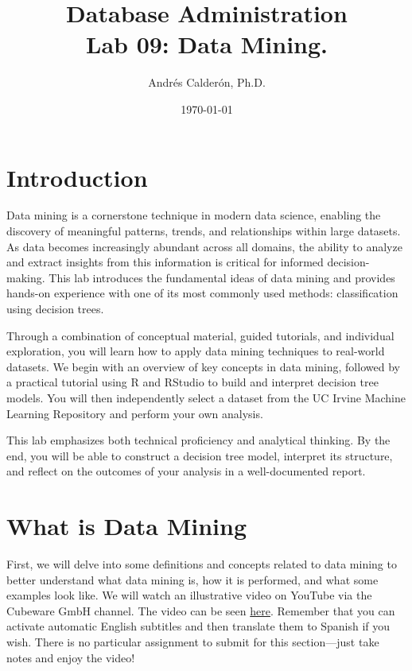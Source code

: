 \documentclass{article}
\title{Database Administration \\ Lab 09: Data Mining.}
\author{Andrés Calderón, Ph.D.}
\date{\today}
\begin{document}
\maketitle

\section{Introduction}

Data mining is a cornerstone technique in modern data science, enabling the discovery of meaningful patterns, trends, and relationships within large datasets. As data becomes increasingly abundant across all domains, the ability to analyze and extract insights from this information is critical for informed decision-making. This lab introduces the fundamental ideas of data mining and provides hands-on experience with one of its most commonly used methods: classification using decision trees.

Through a combination of conceptual material, guided tutorials, and individual exploration, you will learn how to apply data mining techniques to real-world datasets. We begin with an overview of key concepts in data mining, followed by a practical tutorial using R and RStudio to build and interpret decision tree models. You will then independently select a dataset from the UC Irvine Machine Learning Repository and perform your own analysis.

This lab emphasizes both technical proficiency and analytical thinking. By the end, you will be able to construct a decision tree model, interpret its structure, and reflect on the outcomes of your analysis in a well-documented report.

\section{What is Data Mining}
First, we will delve into some definitions and concepts related to data mining to better understand what data mining is, how it is performed, and what some examples look like. We will watch an illustrative video on YouTube via the Cubeware GmbH channel. The video can be seen \href{https://youtu.be/81bm2OsEzbg?si=i3HXb8Gk6tr9bI1l}{here}. Remember that you can activate automatic English subtitles and then translate them to Spanish if you wish. There is no particular assignment to submit for this section—just take notes and enjoy the video!
\end{document}
